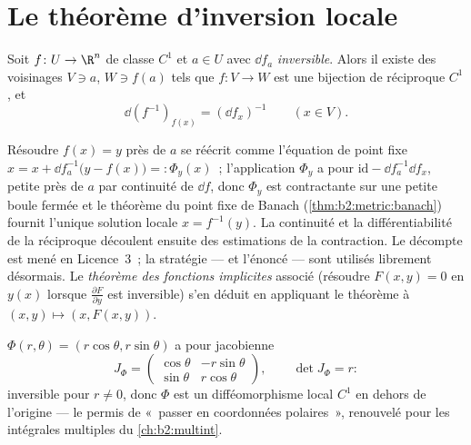 \section{Le théorème d'inversion locale}

\begin{theorem}\label{thm:b2:diffcalc:inverse}
Soit $f \colon U \to \R^n$ de classe $C^1$ et $a \in U$ avec $\dd f_a$
\emph{inversible}. Alors il existe des voisinages  $V \ni a$,
$W \ni f(a)$ tels que $f \colon V \to W$ est une bijection de
réciproque $C^1$, et
\[
\dd (f^{-1})_{f(x)} = (\dd f_x)^{-1} \qquad (x \in V).
\]
\end{theorem}
\admitted

\begin{remark}
Résoudre $f(x) = y$ près de $a$ se réécrit comme l'équation de point
fixe $x = x + \dd f_a^{-1}\bigl(y - f(x)\bigr) =: \Phi_y(x)$~; l'application
$\Phi_y$ a pour  $\mathrm{id} - \dd f_a^{-1}\dd f_x$,
petite près de $a$ par continuité de $\dd f$, donc $\Phi_y$ est
contractante sur une petite boule fermée et le théorème du point
fixe de Banach (\cref{thm:b2:metric:banach}) fournit l'unique
solution locale $x = f^{-1}(y)$. La continuité et la différentiabilité
de la réciproque découlent ensuite des estimations de la contraction.
Le décompte  est mené en Licence~3~; la stratégie --- et
l'énoncé --- sont utilisés librement désormais. Le \emph{théorème des
fonctions implicites} associé (résoudre $F(x, y) = 0$ en $y(x)$
lorsque $\frac{\partial F}{\partial y}$ est inversible) s'en déduit
en appliquant le théorème à $(x, y) \mapsto (x, F(x,y))$.
\end{remark}

\begin{example}\label{ex:b2:diffcalc:polar}
$\Phi(r, \theta) = (r\cos\theta, r\sin\theta)$ a pour jacobienne
\[
J_\Phi = \begin{pmatrix} \cos\theta & -r\sin\theta\\ \sin\theta &
r\cos\theta \end{pmatrix},
\qquad \det J_\Phi = r :
\]
inversible pour $r \neq 0$, donc $\Phi$ est un difféomorphisme local
$C^1$ en dehors de l'origine --- le permis de «~passer en
coordonnées polaires~», renouvelé pour les intégrales multiples du
\cref{ch:b2:multint}.
\end{example}

